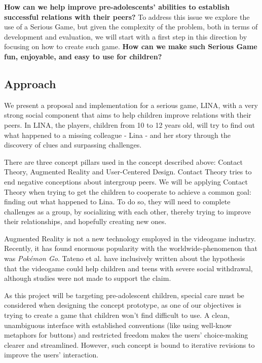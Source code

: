 \par \textbf{How can we help improve pre-adolescents' abilities to establish successful relations with their peers?} To address this issue we explore the use of a Serious Game, but given the complexity of the problem, both in terms of development and evaluation, we will start with a first step in this direction by focusing on how to create such game. \textbf{How can we make such Serious Game fun, enjoyable, and easy to use for children?}


\subsection{Approach}

\par We present a proposal and implementation for a serious game, LINA, with a very strong social component that aims to help children improve relations with their peers. In LINA, the players, children from 10 to 12 years old, will try to find out what happened to a missing colleague - Lina - and her story through the discovery of clues and surpassing challenges.
\par There are three concept pillars used in the concept described above: Contact Theory, Augmented Reality and User-Centered Design. Contact Theory tries to end negative conceptions about intergroup peers. We will be applying Contact Theory when trying to get the children to cooperate to achieve a common goal: finding out what happened to Lina. To do so, they will need to complete challenges as a group, by socializing with each other, thereby trying to improve their relationships, and hopefully creating new ones. 
\par Augmented Reality is not a new technology employed in the videogame industry. Recently, it has found enormous popularity with the worldwide-phenomenon that was \textit{Pokémon Go}. Tateno et al. have inclusively written about the hypothesis that the videogame could help children and teens with severe social withdrawal, although studies were not made to support the claim.\cite{tateno_skokauskas_kato_teo_guerrero_2016}
\par As this project will be targeting pre-adolescent children, special care must be considered when designing the concept prototype, as one of our objectives is trying to create a game that children won't find difficult to use. A clean, unambiguous interface with established conventions (like using well-know metaphors for buttons) and restricted freedom makes the users' choice-making clearer and streamlined. However, such concept is bound to iterative revisions to improve the users' interaction.

